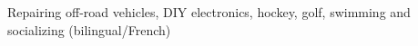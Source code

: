 \documentclass[mm]{res}
\begin{document}
\begin{resume}
\section{\headinginterests}
\tb Repairing off-road vehicles, DIY electronics, hockey, golf, swimming and socializing (bilingual/French)

\end{resume}
\end{document}
